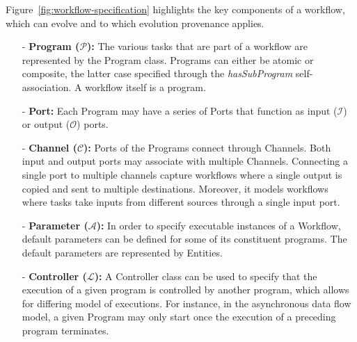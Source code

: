 \documentclass[ao]{iosart2x}
\begin{document}
Figure~\ref{fig:workflow-specification} highlights the key components of a workflow, which can evolve and to which evolution provenance applies. 
\begin{itemize}
\item[-]\textbf{Program (\begin{math}\mathcal{P}\end{math}):} The various tasks that are part of a workflow are represented by the Program class. Programs can either be atomic or composite, the latter case specified through the \textit{hasSubProgram} self-association. A workflow itself is a program.

\item[-]\textbf{Port:} Each Program may have a series of Ports that function as input (\begin{math}\mathcal{I}\end{math}) or output (\begin{math}\mathcal{O}\end{math}) ports.

\item[-]\textbf{Channel (\begin{math}\mathcal{C}\end{math}):} Ports of the Programs connect through Channels. Both input and output ports may associate with multiple Channels. Connecting a single port to multiple channels capture workflows where a single output is copied and sent to multiple destinations. Moreover, it models workflows where tasks take inputs from different sources through a single input port.

\item[-] \textbf{Parameter  (\begin{math}\mathcal{A}\end{math}):} In order to specify executable instances of a Workflow, default parameters can be defined for some of its constituent programs. The default parameters are represented by Entities.

\item[-] \textbf{Controller (\begin{math}\mathcal{L}\end{math}):} A Controller class can be used to specify that the execution of a given program is controlled by another program, which allows for differing model of executions. For instance, in the asynchronous data flow model, a given Program may only start once the execution of a preceding program terminates.
\end{itemize} 
\end{document}
